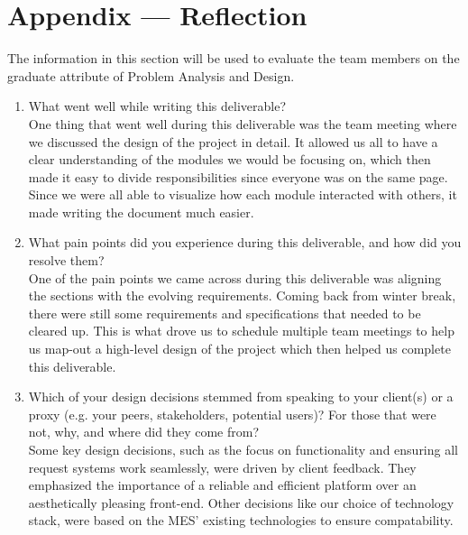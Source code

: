 \documentclass[12pt, titlepage]{article}
\begin{document}


\section*{Appendix --- Reflection}


The information in this section will be used to evaluate the team members on the
graduate attribute of Problem Analysis and Design.



\begin{enumerate}
  \item What went well while writing this deliverable? \\
One thing that went well during this deliverable was the team meeting where we discussed the design of the project in detail. It allowed us all to have a clear understanding of the modules we would be focusing on, which then made it easy to divide responsibilities since everyone was on the same page. Since we were all able to visualize how each module interacted with others, it made writing the document much easier. 

  \item What pain points did you experience during this deliverable, and how
    did you resolve them?\\
One of the pain points we came across during this deliverable was aligning the sections with the evolving requirements. Coming back from winter break, there were still some requirements and specifications that needed to be cleared up. This is what drove us to schedule multiple team meetings to help us map-out a high-level design of the project which then helped us complete this deliverable.

  \item Which of your design decisions stemmed from speaking to your client(s)
  or a proxy (e.g. your peers, stakeholders, potential users)? For those that
  were not, why, and where did they come from?\\
Some key design decisions, such as the focus on functionality and ensuring all request systems work seamlessly, were driven by client feedback. They emphasized the importance of a reliable and efficient platform over an aesthetically pleasing front-end. Other decisions like our choice of technology stack, were based on the MES' existing technologies to ensure compatability.


\end{enumerate}
\end{document}
